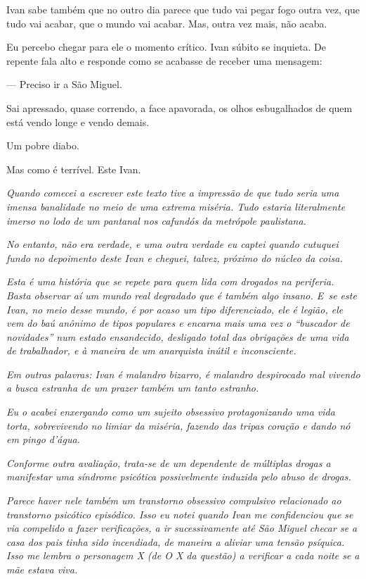 Ivan sabe também que no outro dia parece que tudo vai pegar fogo outra
vez, que tudo vai acabar, que o mundo vai acabar. Mas, outra vez mais,
não acaba.

\asterisc{}

Eu percebo chegar para ele o momento crítico. Ivan súbito se inquieta.
De repente fala alto e responde como se acabasse de receber uma
mensagem:

— Preciso ir a São Miguel.

Sai apressado, quase correndo, a face apavorada, os olhos esbugalhados
de quem está vendo longe e vendo demais.

Um pobre diabo.

Mas como é terrível. Este Ivan.

\begin{center}\asterisc{}\end{center}
\begingroup\small

\emph{Quando comecei a escrever este texto tive a impressão de que tudo
seria uma imensa banalidade no meio de uma extrema miséria. Tudo estaria
literalmente imerso no lodo de um pantanal nos cafundós da metrópole
paulistana.}

\emph{No entanto, não era verdade, e uma outra verdade eu captei quando
cutuquei fundo no depoimento deste Ivan e cheguei, talvez, próximo do
núcleo da coisa.}

\emph{Esta é uma história que se repete para quem lida com drogados na
periferia. Basta observar aí um mundo real degradado que é também algo
insano. E~se este Ivan, no meio desse mundo, é por acaso um tipo
diferenciado, ele é legião, ele vem do baú anônimo de tipos populares e
encarna mais uma vez o ``buscador de novidades'' num estado ensandecido,
desligado total das obrigações de uma vida de trabalhador, e à maneira
de um anarquista inútil e inconsciente.}

\emph{Em outras palavras: Ivan é malandro bizarro, é malandro
despirocado mal vivendo a busca estranha de um prazer também um tanto
estranho.}

\emph{Eu o acabei enxergando como um sujeito obsessivo protagonizando
uma vida torta, sobrevivendo no limiar da miséria, fazendo das tripas
coração e dando nó em pingo d'água.}

\emph{Conforme outra avaliação, trata-se de um dependente de múltiplas
drogas a manifestar uma síndrome psicótica possivelmente induzida pelo
abuso de drogas.}

\emph{Parece haver nele também um transtorno obsessivo compulsivo
relacionado ao transtorno psicótico episódico. Isso eu notei quando Ivan
me confidenciou que se via compelido a fazer verificações, a ir
sucessivamente até São Miguel checar se a casa dos pais tinha sido
incendiada, de maneira a aliviar uma tensão psíquica. Isso me lembra o
personagem X (de O X da questão) a verificar a cada noite se a mãe
estava viva.}

